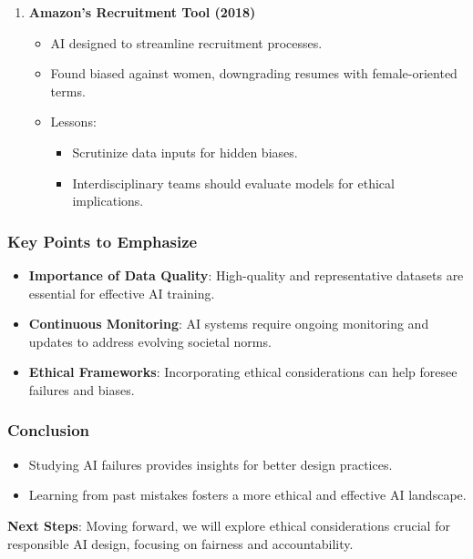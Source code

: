 \documentclass[aspectratio=169]{beamer}
\begin{document}
\begin{frame}[fragile]
\begin{enumerate}
        \item \textbf{Amazon's Recruitment Tool (2018)}
            \begin{itemize}
                \item AI designed to streamline recruitment processes.
                \item Found biased against women, downgrading resumes with female-oriented terms.
                \item Lessons:
                    \begin{itemize}
                        \item Scrutinize data inputs for hidden biases.
                        \item Interdisciplinary teams should evaluate models for ethical implications.
                    \end{itemize}
            \end{itemize}  
    \end{enumerate}
\end{frame}

\begin{frame}[fragile]
    \frametitle{Key Points to Emphasize}
    \begin{itemize}
        \item \textbf{Importance of Data Quality}: High-quality and representative datasets are essential for effective AI training.
        \item \textbf{Continuous Monitoring}: AI systems require ongoing monitoring and updates to address evolving societal norms.
        \item \textbf{Ethical Frameworks}: Incorporating ethical considerations can help foresee failures and biases.
    \end{itemize}
\end{frame}

\begin{frame}[fragile]
    \frametitle{Conclusion}
    \begin{itemize}
        \item Studying AI failures provides insights for better design practices.
        \item Learning from past mistakes fosters a more ethical and effective AI landscape.
    \end{itemize}
    \textbf{Next Steps}: Moving forward, we will explore ethical considerations crucial for responsible AI design, focusing on fairness and accountability.
\end{frame}
\end{document}
